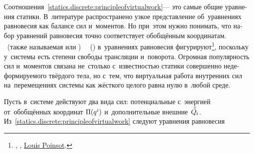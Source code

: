 \begin{otherlanguage}{russian}
Соотношения~\eqref{statics.discrete:principleofvirtualwork}\:--- это самые общие уравнения статики.
В~литературе распространено узкое представление об~уравнениях равновесия как балансе сил и~моментов.
Но при~этом нужно понимать, что набор уравнений равновесия точно соответствует обобщённым координатам.
~(также называемая  или )
~~()
в~уравнениях равновесия фигурируют\footnote{ \textcolor{magenta}{} , ,    
\href{https://gallica.bnf.fr/ark:/12148/bpt6k6213152z.texteImage}{}
\href{https://en.wikipedia.org/wiki/Louis_Poinsot}{Louis Poinsot}.}\hbox{\hspace{-0.5ex},}
поскольку у~системы есть степени свободы трансляции и~поворота.
Огромная популярность сил и~моментов связана не~столько с~известностью статики совершенно недеформируемого твёрдого тела, но с~тем, что виртуальная работа внутренних сил на~перемещениях системы как жёсткого целого равна нулю в~любой среде.

Пусть в~системе действуют два вида сил: потенциальные с~энергией от~обобщённых координат ${\Pi(q^i)}$ и~дополнительные внешние~${\mathcircabove{Q}_{\hspace{-0.1ex}i}}$.
Из~\eqref{statics.discrete:principleofvirtualwork} следуют уравнения равновесия


\end{otherlanguage}

